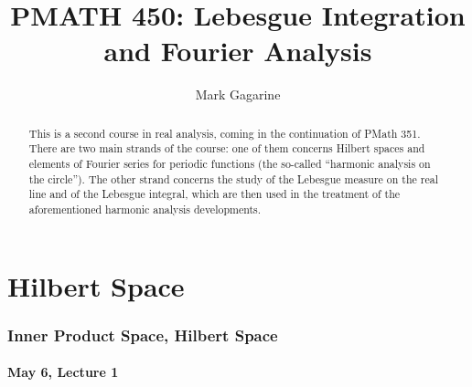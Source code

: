 \documentclass[11pt]{amsart}
\title[PMath 450 -- Summer 2024]{PMATH 450: Lebesgue Integration and Fourier Analysis}
\author[M. Gagarine]{Mark Gagarine}
\theoremstyle{definition}
\numberwithin{equation}{section}
\begin{document}
\begin{abstract}
This is a second course in real analysis, coming in the continuation of PMath 351. There are two main strands of the course: one of them concerns Hilbert spaces and elements of Fourier series for periodic functions (the so-called “harmonic analysis on
the circle”). The other strand concerns the study of the Lebesgue measure on the real line and of the Lebesgue integral, which are then used in the treatment of the aforementioned
harmonic analysis developments. 
\end{abstract}

\maketitle

\tableofcontents

\newpage

\part{Hilbert Space}

\section{Inner Product Space, Hilbert Space}

\subsection{May 6, Lecture 1}
\end{document}
